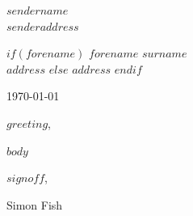 \documentclass{article}
\begin{document}
\setlength{\parindent}{0em}
\begin{flushright}
  $sendername$ \\
  \medskip
	$senderaddress$
\end{flushright}

$if(forename)$
  $forename$ $surname$
  \medskip \\
  $address$
$else$
  $address$
$endif$

\bigskip

\today
\bigskip

$greeting$,
\setlength{\parindent}{2em}
\setlength{\parskip}{0.5cm plus4mm minus3mm}
\bigskip

$body$

\bigskip

$signoff$,

\vspace{2\baselineskip}

Simon Fish
\end{document}
